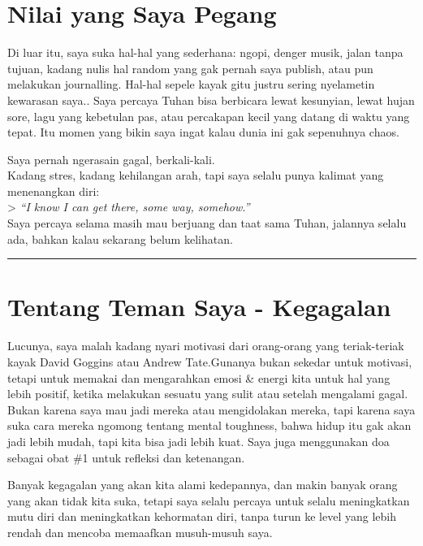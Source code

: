 \documentclass[
  letterpaper,
  DIV=11,
  numbers=noendperiod]{scrreprt}
\begin{document}
\section{Nilai yang Saya Pegang}\label{nilai-yang-saya-pegang}

Di luar itu, saya suka hal-hal yang sederhana: ngopi, denger musik,
jalan tanpa tujuan, kadang nulis hal random yang gak pernah saya
publish, atau pun melakukan journalling. Hal-hal sepele kayak gitu
justru sering nyelametin kewarasan saya.. Saya percaya Tuhan bisa
berbicara lewat kesunyian, lewat hujan sore, lagu yang kebetulan pas,
atau percakapan kecil yang datang di waktu yang tepat. Itu momen yang
bikin saya ingat kalau dunia ini gak sepenuhnya chaos.

Saya pernah ngerasain gagal, berkali-kali.\\
Kadang stres, kadang kehilangan arah, tapi saya selalu punya kalimat
yang menenangkan diri:\\
\textgreater{} \emph{``I know I can get there, some way, somehow.''}\\
Saya percaya selama masih mau berjuang dan taat sama Tuhan, jalannya
selalu ada, bahkan kalau sekarang belum kelihatan.

\begin{center}\rule{0.5\linewidth}{0.5pt}\end{center}

\section{Tentang Teman Saya -
Kegagalan}\label{tentang-teman-saya---kegagalan}

Lucunya, saya malah kadang nyari motivasi dari orang-orang yang
teriak-teriak kayak David Goggins atau Andrew Tate.Gunanya bukan sekedar
untuk motivasi, tetapi untuk memakai dan mengarahkan emosi \& energi
kita untuk hal yang lebih positif, ketika melakukan sesuatu yang sulit
atau setelah mengalami gagal. Bukan karena saya mau jadi mereka atau
mengidolakan mereka, tapi karena saya suka cara mereka ngomong tentang
mental toughness, bahwa hidup itu gak akan jadi lebih mudah, tapi kita
bisa jadi lebih kuat. Saya juga menggunakan doa sebagai obat \#1 untuk
refleksi dan ketenangan.

Banyak kegagalan yang akan kita alami kedepannya, dan makin banyak orang
yang akan tidak kita suka, tetapi saya selalu percaya untuk selalu
meningkatkan mutu diri dan meningkatkan kehormatan diri, tanpa turun ke
level yang lebih rendah dan mencoba memaafkan musuh-musuh saya.
\end{document}
